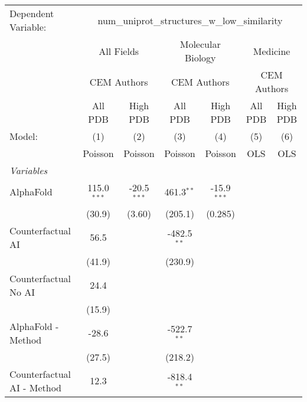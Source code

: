 \begingroup
\centering
\begin{tabular}{lcccccc}
   \tabularnewline \midrule \midrule
   Dependent Variable: & \multicolumn{6}{c}{num\_uniprot\_structures\_w\_low\_similarity}\\
 & \multicolumn{2}{c}{All Fields} & \multicolumn{2}{c}{Molecular Biology} & \multicolumn{2}{c}{Medicine} \\
\cmidrule(lr){2-3} \cmidrule(lr){4-5} \cmidrule(lr){6-7}
 & \multicolumn{2}{c}{CEM Authors} & \multicolumn{2}{c}{CEM Authors} & \multicolumn{2}{c}{CEM Authors} \\
\cmidrule(lr){2-3} \cmidrule(lr){4-5} \cmidrule(lr){6-7}
 & \multicolumn{1}{c}{All PDB} & \multicolumn{1}{c}{High PDB} & \multicolumn{1}{c}{All PDB} & \multicolumn{1}{c}{High PDB} & \multicolumn{1}{c}{All PDB} & \multicolumn{1}{c}{High PDB} \\
\cmidrule(lr){2-2} \cmidrule(lr){3-3} \cmidrule(lr){4-4} \cmidrule(lr){5-5} \cmidrule(lr){6-6} \cmidrule(lr){7-7}
   Model:                     & (1)           & (2)           & (3)           & (4)           & (5)  & (6)\\  
                              &  Poisson      & Poisson       & Poisson       & Poisson       & OLS  & OLS\\  
   \midrule
   \emph{Variables}\\
   AlphaFold                  & 115.0$^{***}$ & -20.5$^{***}$ & 461.3$^{**}$  & -15.9$^{***}$ &      &   \\   
                              & (30.9)        & (3.60)        & (205.1)       & (0.285)       &      &   \\   
   Counterfactual AI          & 56.5          &               & -482.5$^{**}$ &               &      &   \\   
                              & (41.9)        &               & (230.9)       &               &      &   \\   
   Counterfactual No AI       & 24.4          &               &               &               &      &   \\   
                              & (15.9)        &               &               &               &      &   \\   
   AlphaFold - Method         & -28.6         &               & -522.7$^{**}$ &               &      &   \\   
                              & (27.5)        &               & (218.2)       &               &      &   \\   
   Counterfactual AI - Method & 12.3          &               & -818.4$^{**}$ &               &      &   \\   

\end{tabular}
